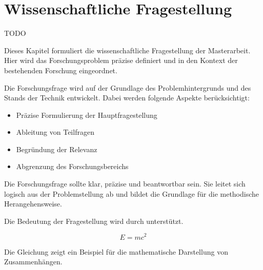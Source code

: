 
\chapter{Wissenschaftliche Fragestellung}\label{cha:researchQuestion}

TODO

Dieses Kapitel formuliert die wissenschaftliche Fragestellung der Masterarbeit. Hier wird das Forschungsproblem präzise definiert und in den Kontext der bestehenden Forschung eingeordnet.

Die Forschungsfrage wird auf der Grundlage des Problemhintergrunds und des Stands der Technik entwickelt. Dabei werden folgende Aspekte berücksichtigt:

\begin{itemize}[leftmargin=0.63cm, label=\textbullet]
    \item Präzise Formulierung der Hauptfragestellung
    \item Ableitung von Teilfragen
    \item Begründung der Relevanz
    \item Abgrenzung des Forschungsbereichs
\end{itemize}

Die Forschungsfrage sollte klar, präzise und beantwortbar sein. Sie leitet sich logisch aus der Problemstellung ab und bildet die Grundlage für die methodische Herangehensweise.

Die Bedeutung der Fragestellung wird durch \cite{beispiel2024} unterstützt.

\begin{equation}
\label{eq:beispiel}
E = mc^2
\end{equation}

Die Gleichung zeigt ein Beispiel für die mathematische Darstellung von Zusammenhängen.

